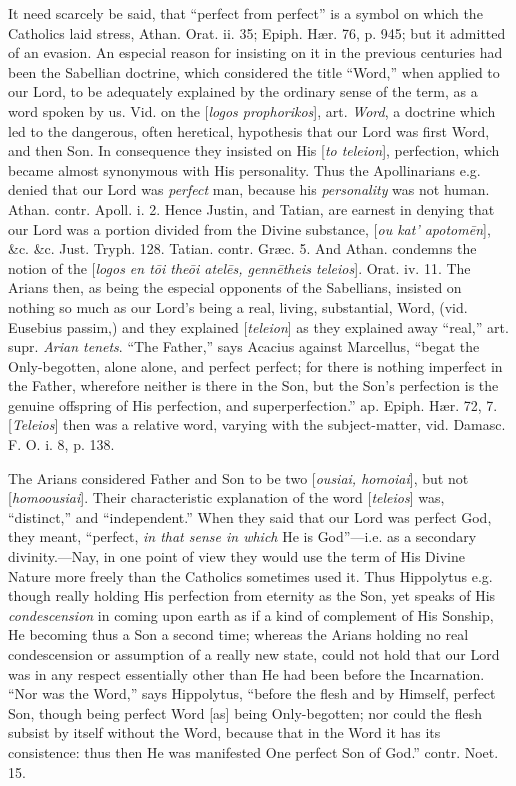 It need scarcely be said, that ``perfect from
perfect'' is a symbol on which the Catholics laid stress, Athan. Orat.
ii. 35; Epiph. Hær. 76, p. 945; but it admitted of an evasion. An
especial reason for insisting on it in the previous centuries had been
the Sabellian doctrine, which considered the title ``Word,'' when
applied to our Lord, to be adequately explained by the ordinary sense
of the term, as a word spoken by us. Vid. on the [\emph{logos prophorikos}],
art. \emph{Word}, a doctrine which led to the dangerous, often
heretical, hypothesis that our Lord was first Word, and then Son. In
consequence they insisted on His [\emph{to teleion}], perfection,
which became almost synonymous with His personality. Thus the
Apollinarians e.g. denied that our Lord was \emph{perfect} man,
because his \emph{personality} was not human. Athan. contr. Apoll. i.
2. Hence Justin, and Tatian, are earnest in denying that our Lord was
a portion divided from the Divine substance, [\emph{ou kat'
apotom\={e}n}], \&c. \&c. Just. Tryph. 128. Tatian.
contr. Græc. 5. And Athan. condemns the notion of the [\emph{logos en t\={o}i
the\={o}i atel\={e}s, genn\={e}theis teleios}]. Orat. iv.
11. The Arians then, as being the especial opponents of the
Sabellians, insisted on nothing so much as our Lord's being a real,
living, substantial, Word, (vid. Eusebius passim,) and they explained
[\emph{teleion}] as they explained away ``real,'' art. supr. \emph{Arian
tenets}. ``The Father,'' says Acacius against Marcellus, ``begat the
Only-begotten, alone alone, and perfect perfect; for there is nothing
imperfect in the Father, wherefore neither is there in the Son, but
the Son's perfection is the genuine offspring of His perfection, and
superperfection.'' ap. Epiph. Hær. 72, 7. [\emph{Teleios}] then was a
relative word, varying with the subject-matter, vid. Damasc. F. O. i.
8, p. 138.

The Arians considered Father and Son to be two [\emph{ousiai,
homoiai}], but not [\emph{homoousiai}]. Their characteristic
explanation of the word [\emph{teleios}] was, ``distinct,'' and ``independent.''
When they said that our Lord was perfect God, they meant, ``perfect, \emph{in
that sense in which} He is God''—i.e. as a secondary
divinity.—Nay, in one point of view they would use the term of His
Divine Nature more freely than the Catholics sometimes used it. Thus
Hippolytus e.g. though really holding His perfection from eternity as
the Son, yet speaks of His \emph{condescension} in coming upon earth
as if a kind of complement of His Sonship, He becoming thus a Son a
second time; whereas the Arians holding no real condescension or
assumption of a really new state, could not hold that our Lord was in
any respect essentially other than He had been before the Incarnation.
``Nor was the Word,'' says Hippolytus, ``before the flesh and by Himself,
perfect Son, though being perfect Word [as] being Only-begotten;
nor could the flesh subsist by itself without the Word, because that
in the Word it has its consistence: thus then He was manifested One
perfect Son of God.'' contr. Noet. 15.

